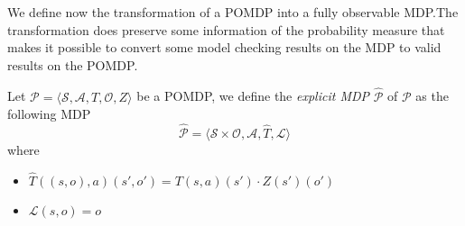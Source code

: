 
We define now the transformation of a \ac{POMDP} into a fully observable \ac{MDP}.The transformation does preserve some information of the probability measure that makes it possible to convert some model checking results on the \ac{MDP} to valid results on the \ac{POMDP}.

\begin{definition}\label{def:emdp}
Let $\mathcal{P} = \langle \mathcal{S},\mathcal{A},T,\mathcal{O},Z \rangle$ be a \ac{POMDP}, we define the \emph{explicit \ac{MDP}} $\widehat{\mathcal{P}}$ of $\mathcal{P}$ as the following \ac{MDP}
$$ \widehat{\mathcal{P}} = \langle \mathcal{S}\times\mathcal{O}, \mathcal{A}, \widehat{T}, \mathscr{L} \rangle $$
where 
\begin{itemize}
	\item $\widehat{T}((s,o),a)(s',o') = T(s,a)(s')\cdot Z(s')(o')$
	\item $\mathscr{L}(s,o) = o$
\end{itemize}
\end{definition}
%
\setlength\intextsep{0pt}
